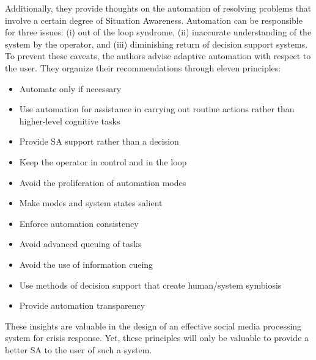 Additionally, they provide thoughts on the automation of resolving problems that involve a certain degree of Situation Awareness.
Automation can be responsible for three issues: (i) out of the loop syndrome, (ii) inaccurate understanding of the system by the operator, and (iii) diminishing return of decision support systems.
To prevent these caveats, the authors advise adaptive automation with respect to the user.
They organize their recommendations through eleven principles:

\begin{itemize}
    \item Automate only if necessary
    \item Use automation for assistance in carrying out routine actions rather than higher-level cognitive tasks
    \item Provide SA support rather than a decision
    \item Keep the operator in control and in the loop
    \item Avoid the proliferation of automation modes
    \item Make modes and system states salient
    \item Enforce automation consistency
    \item Avoid advanced queuing of tasks
    \item Avoid the use of information cueing
    \item Use methods of decision support that create human/system symbiosis
    \item Provide automation transparency
\end{itemize}

These insights are valuable in the design of an effective social media processing system for crisis response.
Yet, these principles will only be valuable to provide a better SA to the user of such a system.

